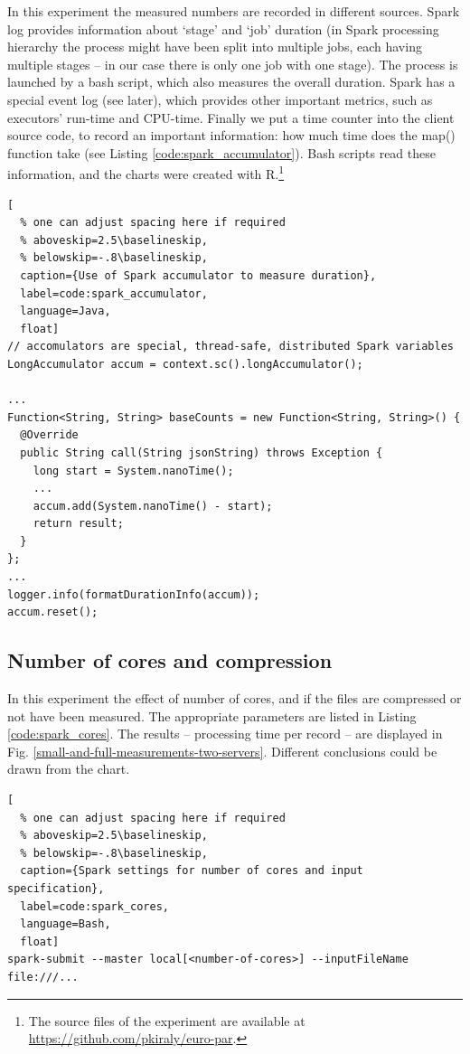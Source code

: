 In this experiment the measured numbers are recorded in different sources. Spark log provides information about `stage' and `job' duration (in Spark processing hierarchy the process might have been split into multiple jobs, each having multiple stages -- in our case there is only one job with one stage). The process is launched by a bash script, which also measures the overall duration. Spark has a special event log (see later), which provides other important metrics, such as executors' run-time and CPU-time. Finally we put a time counter into the client source code, to record an important information: how much time does the map() function take (see Listing \ref{code:spark_accumulator}). Bash scripts read these information, and the charts were created with R.\footnote{The source files of the experiment are available at \url{https://github.com/pkiraly/euro-par}.}

\begin{lstlisting}[
  % one can adjust spacing here if required
  % aboveskip=2.5\baselineskip,
  % belowskip=-.8\baselineskip,
  caption={Use of Spark accumulator to measure duration},
  label=code:spark_accumulator,
  language=Java,
  float]
// accomulators are special, thread-safe, distributed Spark variables
LongAccumulator accum = context.sc().longAccumulator();

...
Function<String, String> baseCounts = new Function<String, String>() {
  @Override
  public String call(String jsonString) throws Exception {
    long start = System.nanoTime();
    ...
	accum.add(System.nanoTime() - start);
    return result;
  }
};
...
logger.info(formatDurationInfo(accum));
accum.reset();
\end{lstlisting}

\subsection{Number of cores and compression}

In this experiment the effect of number of cores, and if the files are compressed or not have been measured. The appropriate parameters are listed in Listing \ref{code:spark_cores}. The results -- processing time per record -- are displayed in Fig. \ref{small-and-full-measurements-two-servers}. Different conclusions could be drawn from the chart.

\begin{lstlisting}[
  % one can adjust spacing here if required
  % aboveskip=2.5\baselineskip,
  % belowskip=-.8\baselineskip,
  caption={Spark settings for number of cores and input specification},
  label=code:spark_cores,
  language=Bash,
  float]
spark-submit --master local[<number-of-cores>] --inputFileName file:///...
\end{lstlisting}

